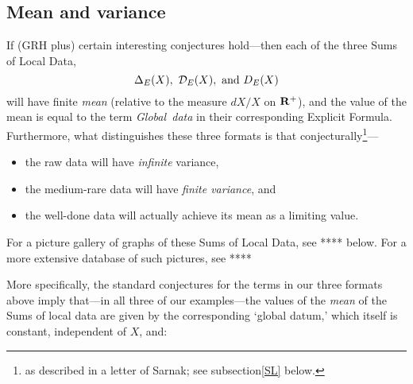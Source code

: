 \documentclass[11pt]{article}
\theoremstyle{plain}
\theoremstyle{definition}
\numberwithin{equation}{section}
\numberwithin{figure}{section}
\numberwithin{table}{section}
\begin{document}
 \subsection{Mean and variance}
If (GRH plus)  certain interesting conjectures hold---then  each of the three  Sums of Local Data, $${\Delta}_E(X), \ {\mathcal D}_E(X), \ {\rm and} \ D_E(X)$$ will have finite {\it mean}  (relative to the measure $dX/X$ on ${\bf R}^+$), and the value of the mean is equal to the term  {\rm{\it Global\ data}} in their corresponding Explicit Formula. Furthermore, what distinguishes these three formats is that conjecturally{\footnote{ as described in a letter of Sarnak; see subsection{\ref{SL}} below.}}---
   \begin{itemize}
   \item the raw data will have {\it infinite} variance,
   \item the medium-rare data will have {\it finite variance}, and
   \item the well-done data will actually achieve its mean as a limiting value.
   \end{itemize}

   For a picture gallery of graphs of these Sums of Local Data, see **** below. For a more extensive database of such pictures, see ****




   More specifically, the standard conjectures for the terms in our three formats above imply that---in all three of our examples---the values of the  {\it mean}  of the {Sums of local data} are given by the corresponding `global datum,' which itself is constant, independent of $X$, and:
\end{document}
